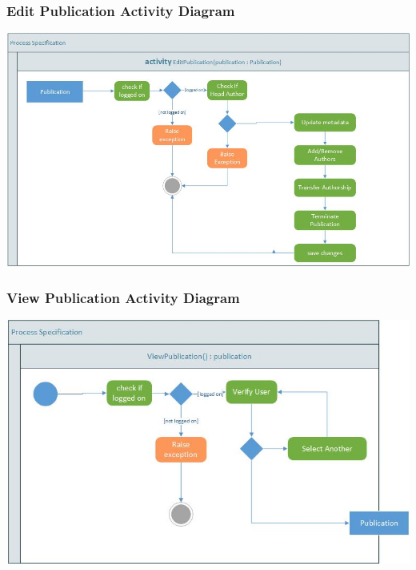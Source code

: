 \documentclass[a4paper,12pt]{article}
\begin{document}
	\subsubsection{Edit Publication Activity Diagram}
	\includegraphics[width=1\textwidth]{./activity_edit_pub.jpg}\\[1.5cm]

	\subsubsection{View Publication Activity Diagram}
	\includegraphics[width=1\textwidth]{./activity_view_pub.jpg}\\[1.5cm]
	
\end{document}
